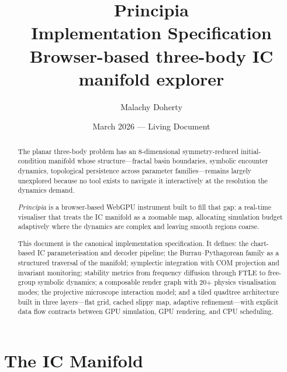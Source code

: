 \documentclass[11pt]{report}
\title{%
  \textbf{Principia}\\[0.35em]
  \large Implementation Specification\\[0.25em]
  \normalsize Browser-based three-body IC manifold explorer%
}
\author{Malachy Doherty}
\date{March 2026 --- Living Document}
\begin{document}
\maketitle

\begin{abstract}
The planar three-body problem has an 8-dimensional symmetry-reduced initial-condition manifold whose structure---fractal basin boundaries, symbolic encounter dynamics, topological persistence across parameter families---remains largely unexplored because no tool exists to navigate it interactively at the resolution the dynamics demand.

\emph{Principia} is a browser-based WebGPU instrument built to fill that gap: a real-time visualiser that treats the IC manifold as a zoomable map, allocating simulation budget adaptively where the dynamics are complex and leaving smooth regions coarse.

This document is the canonical implementation specification. It defines: the chart-based IC parameterisation and decoder pipeline; the Burrau--Pythagorean family as a structured traversal of the manifold; symplectic integration with COM projection and invariant monitoring; stability metrics from frequency diffusion through FTLE to free-group symbolic dynamics; a composable render graph with 20+ physics visualisation modes; the projective microscope interaction model; and a tiled quadtree architecture built in three layers---flat grid, cached slippy map, adaptive refinement---with explicit data flow contracts between GPU simulation, GPU rendering, and CPU scheduling.
\end{abstract}

\tableofcontents
\newpage

\part{The IC Manifold}
\label{part:manifold}

\begin{center}
\end{center}
\end{document}
